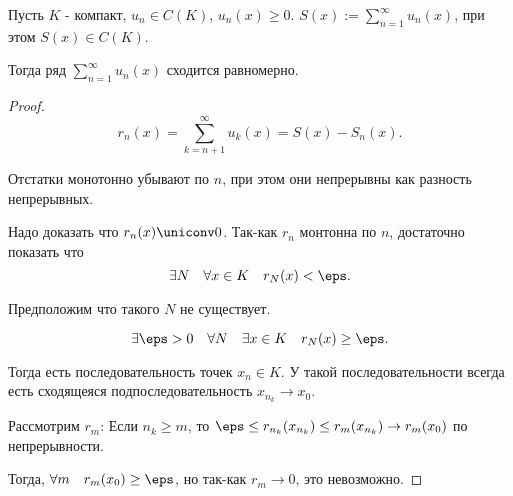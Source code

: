 \begin{theorem} \thmslashn

    Пусть $K$ - компакт, $u_{n}\in C(K)$, $u_{n}(x) \ge 0$. $S(x) := \sum\limits_{n=1}^{\infty} u_{n}(x)$, при этом $S(x)\in C(K)$.

    Тогда ряд $\sum\limits_{n=1}^{\infty} u_{n}(x)$ сходится равномерно.
    \begin{proof} \thmslashn
    
        \[ r_{n}(x) = \sum\limits_{k=n+1}^{\infty} u_{k}(x) = S(x) - S_{n}(x) .\]

        Отстатки монотонно убывают по $n$, при этом они непрерывны как разность непрерывных.

        Надо доказать что $r_{n}(x) \uniconv 0$. Так-как $r_{n}$ монтонна по $n$, достаточно показать что
        \[ \exists{N}\quad \forall{x\in K}\quad r_{N}(x) < \eps .\]

        Предположим что такого $N$ не существует.

        \[ \exists{\eps > 0}\quad \forall{N}\quad \exists{x\in K}\quad r_{N}(x) \ge  \eps .\] 

        Тогда есть последовательность точек $x_{n}\in K$. У такой последовательности всегда есть сходящеяся подпоследовательность $x_{n_{k}} \to x_0$.

        Рассмотрим $r_{m}$: Если $n_{k} \ge m$, то $\eps \le r_{n_{k}}(x_{n_{k}}) \le r_{m}(x_{n_{k}}) \to r_{m}(x_0)$ по непрерывности.

        Тогда, $\forall{m}\quad r_{m}(x_0) \ge \eps$, но так-как $r_{m} \to 0$, это невозможно.
    \end{proof}
\end{theorem}
